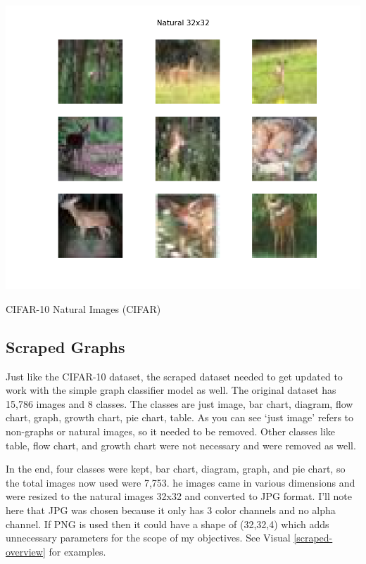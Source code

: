 \documentclass[12pt]{article}
\begin{document}
            \begin{table}[ht]
            
                \begin{center}

                    \includegraphics[scale=0.6]{natural_overview.png}
                    \caption{CIFAR-10 Natural Images (CIFAR) \cite{krizhevsky2009}}
                    \label{cifar-overview}
        
                \end{center}
                
            \end{table}

            
        \subsection{Scraped Graphs}
    
            Just like the CIFAR-10 dataset, the scraped dataset \cite{sunedition2021} needed to get updated to work 
            with the simple graph classifier model as well. The original dataset has 15,786 images and 8 classes. 
            The classes are just image, bar chart, diagram, flow chart, graph, growth chart, pie chart, table. 
            As you can see ‘just image’ refers to non-graphs or natural images, so it needed to be removed. 
            Other classes like table, flow chart, and growth chart were not necessary and were removed as well.

            In the end, four classes were kept, bar chart, diagram, graph, and pie chart, 
            so the total images now used were 7,753. 
            he images came in various dimensions and were resized to the natural images 32x32 and converted to JPG format. 
            I’ll note here that JPG was chosen because it only has 3 color channels and no alpha channel. 
            If PNG is used then it could have a shape of (32,32,4) which adds unnecessary parameters for the scope of my objectives.
            See Visual \ref{scraped-overview} for examples.
            
\end{document}
